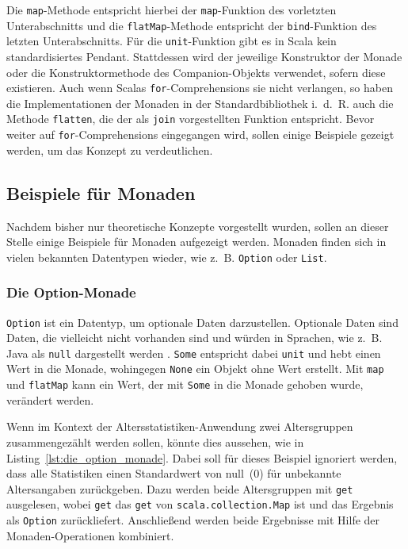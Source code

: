 Die \lstinline|map|-Methode entspricht hierbei der \lstinline|map|-Funktion des vorletzten Unterabschnitts und die \lstinline|flatMap|-Methode entspricht der \lstinline|bind|-Funktion des letzten Unterabschnitts.
Für die \lstinline|unit|-Funktion gibt es in Scala kein standardisiertes Pendant.
Stattdessen wird der jeweilige Konstruktor der Monade oder die Konstruktormethode des Companion-Objekts verwendet, sofern diese existieren.
Auch wenn Scalas \lstinline|for|-Comprehensions sie nicht verlangen, so haben die Implementationen der Monaden in der Standardbibliothek i.~d.~R. auch die Methode \lstinline|flatten|, die der als \lstinline|join| vorgestellten Funktion entspricht.
Bevor weiter auf \lstinline|for|-Comprehensions eingegangen wird, sollen einige Beispiele gezeigt werden, um das Konzept zu verdeutlichen.


\subsection{Beispiele für Monaden} %
\label{sub:beispiele_fuer_monaden}

Nachdem bisher nur theoretische Konzepte vorgestellt wurden, sollen an dieser Stelle einige Beispiele für Monaden aufgezeigt werden.
Monaden finden sich in vielen bekannten Datentypen wieder, wie z.~B. \lstinline|Option| oder \lstinline|List|.

\subsubsection{Die Option-Monade} %
\label{ssub:die_option_monade}

\lstinline|Option| ist ein Datentyp, um optionale Daten darzustellen.
Optionale Daten sind Daten, die vielleicht nicht vorhanden sind und würden in Sprachen, wie z.~B. Java als \lstinline|null| dargestellt werden \cite[vgl.][S.~289]{programming_in_scala}.
\lstinline|Some| entspricht dabei \lstinline|unit| und hebt einen Wert in die Monade, wohingegen \lstinline|None| ein Objekt ohne Wert erstellt.
Mit \lstinline|map| und \lstinline|flatMap| kann ein Wert, der mit \lstinline|Some| in die Monade gehoben wurde, verändert werden.

Wenn im Kontext der Altersstatistiken-Anwendung zwei Altersgruppen zusammengezählt werden sollen, könnte dies aussehen, wie in Listing~\ref{lst:die_option_monade}.
Dabei soll für dieses Beispiel ignoriert werden, dass alle Statistiken einen Standardwert von null~(0) für unbekannte Altersangaben zurückgeben.
Dazu werden beide Altersgruppen mit \lstinline|get| ausgelesen, wobei \lstinline|get| das \lstinline|get| von \lstinline|scala.collection.Map| ist und das Ergebnis als \lstinline|Option| zurückliefert.
Anschließend werden beide Ergebnisse mit Hilfe der Monaden-Operationen kombiniert.

